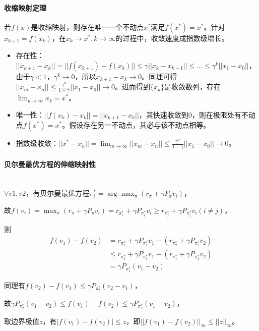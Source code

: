 \documentclass[
12pt, %
a4paper, 
oneside, %
headinclude,footinclude, %
]{scrartcl}
\begin{document}
\paragraph{收缩映射定理}
若$ f(x) $是收缩映射，则存在唯一一个不动点$ x^* $满足$ f(x^*) = x^* $。针对$ x_{k + 1} = f(x_k) $，在$ x_k \to x^*, k \to \infty $的过程中，收敛速度成指数级增长。
\begin{itemize}
\item 存在性：$ ||x_{k + 1} - x_k|| = ||f(x_{k + 1}) - f(x_k)|| \leq \gamma||x_k - x_{k - 1}|| \leq \dots \leq \gamma^k||x_1 - x_0|| $，由于$ \gamma < 1 $，$ \gamma^k \to 0 $，所以$ x_{k + 1} - x_k \to 0 $。同理可得$ ||x_m - x_n|| \leq \frac{\gamma^n}{1 - \gamma}||x_1 - x_0|| \to 0 $。进而得到$ \{x_k\} $是收敛数列，存在$ \lim_{k \to \infty} x_k = x^* $。
\item 唯一性：$ ||f(x_k) - x_k|| = ||x_{k + 1} - x_k||$，其快速收敛到$ 0 $，则在极限处有不动点$ f(x^*) = x^* $。假设存在另一不动点，其必与该不动点相等。
\item 指数级收敛：$ ||x^* - x_n|| = \lim_{m \to \infty}||x_m - x_n|| \leq \frac{\gamma^n}{1 - \gamma}||x_1 - x_0|| \to 0 $。
\end{itemize}
\paragraph{贝尔曼最优方程的伸缩映射性}~\\

$ \forall v1,v2 $，有贝尔曼最优方程$ \pi_i^* \doteq \arg \max_{\pi} (r_\pi + \gamma P_\pi v_i) $，

故$ f(v_i) = \max_{\pi} (r_\pi + \gamma P_\pi v_i) = r_{\pi_i^*} + \gamma P_{\pi_i^*} v_i \geq r_{\pi_j^*} + \gamma P_{\pi_j^*} v_i (i \neq j) $，

则
\begin{align*}
f(v_1) - f(v_2) 
&= r_{\pi_1^*} + \gamma P_{\pi_1^*} v_1 - (r_{\pi_2^*} + \gamma P_{\pi_2^*} v_2) \\
&\leq r_{\pi_1^*} + \gamma P_{\pi_1^*} v_1 - (r_{\pi_1^*} + \gamma P_{\pi_1^*} v_2) \\
&= \gamma P_{\pi_1^*} (v_1 - v_2)
\end{align*}

同理有$ f(v_2) - f(v_1) \leq \gamma P_{\pi_2^*} (v_2 - v_1) $，

故$ \gamma P_{\pi_2^*} (v_1 - v_2)\leq f(v_1) - f(v_2) \leq \gamma P_{\pi_1^*} (v_1 - v_2) $，

取边界极值$ z $，有$ |f(v_1) - f(v_2)| \leq z $，即$ ||f(v_1) - f(v_2)||_\infty \leq ||z||_\infty $。
\end{document}
